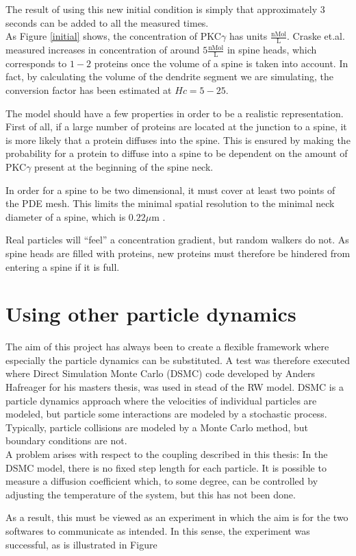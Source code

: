 \noindent The result of using this new initial condition is simply that approximately $3$ seconds can be added to all the measured times. \\

As Figure \ref{initial} shows, the concentration of PKC$\gamma$ has units $\frac{\text{nMol}}{\text{L}}$. 
Craske et.al. measured increases in concentration of around $5\frac{\text{nMol}}{\text{L}}$ in spine heads, which corresponds to $1-2$ proteins once the volume of a spine is taken into account. 
In fact, by calculating the volume of the dendrite segment we are simulating, the conversion factor has been estimated at $Hc = 5-25$. 

The model should have a few properties in order to be a realistic representation. First of all, if a large number of proteins are located at the junction to a spine, it is more likely that a protein diffuses into the spine. This is ensured by making the probability for a protein to diffuse into a spine to be dependent on the amount of PKC$\gamma$ present at the beginning of the spine neck. 

In order for a spine to be two dimensional, it must cover at least two points of the PDE mesh. This limits the minimal spatial resolution to the minimal neck diameter of a spine, which is $0.22\mu$m \cite{arellano2007ultrastructure}.

Real particles will ``feel'' a concentration gradient, but random walkers do not. As spine heads are filled with proteins, new proteins must therefore be hindered from entering a spine if it is full. 

\section{Using other particle dynamics}

The aim of this project has always been to create a flexible framework where especially the particle dynamics can be substituted. 
A test was therefore executed where Direct Simulation Monte Carlo (DSMC) code developed by Anders Hafreager for his masters thesis, was used in stead of the RW model. 
DSMC is a particle dynamics approach where the velocities of individual particles are modeled, but particle some interactions are modeled by a stochastic process. 
Typically, particle collisions are modeled by a Monte Carlo method, but boundary conditions are not.\\

\noindent A problem arises with respect to the coupling described in this thesis: 
In the DSMC model, there is no fixed step length for each particle. It is possible to measure a diffusion coefficient which, to some degree, can be controlled by adjusting the temperature of the system, but this has not been done. 

As a result, this must be viewed as an experiment in which the aim is for the two softwares to communicate as intended. 
In this sense, the experiment was successful, as is illustrated in Figure 

